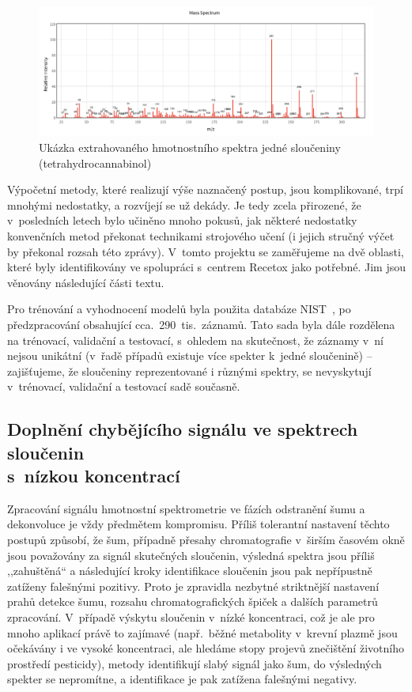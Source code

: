 \documentclass[a4paper,11pt]{article}
\begin{document}
\begin{figure}
\begin{center}
\includegraphics[width=.8\hsize]{thc}
\end{center}
\caption{Ukázka extrahovaného hmotnostního spektra jedné sloučeniny (tetrahydrocannabinol)}
\label{f:thc}
\end{figure}

Výpočetní metody, které realizují výše naznačený postup, jsou komplikované, trpí mnohými nedostatky,
a rozvíjejí se už dekády.
Je tedy zcela přirozené, že v~posledních letech bylo učiněno mnoho pokusů, jak některé nedostatky 
konvenčních metod překonat technikami strojového učení (i jejich stručný výčet by překonal rozsah této zprávy).
V~tomto projektu se zaměřujeme na dvě oblasti, které byly identifikovány ve spolupráci s~centrem Recetox jako potřebné.
Jim jsou věnovány následující části textu.

Pro trénování a vyhodnocení modelů byla použita databáze NIST~\cite{nist}, po předzpracování obsahující
cca.~290~tis.\ záznamů. 
Tato sada byla dále rozdělena na trénovací, validační a testovací,
s~ohledem na skutečnost, že záznamy v~ní nejsou unikátní (v~řadě případů existuje více spekter k~jedné sloučenině) --
zajišťujeme, že sloučeniny reprezentované i různými spektry, se nevyskytují v~trénovací, validační a testovací sadě
současně. 

\subsection{Doplnění chybějícího signálu ve spektrech sloučenin\\ s~nízkou koncentrací}

Zpracování signálu hmotnostní spektrometrie ve fázích odstranění šumu a dekonvoluce je vždy předmětem kompromisu.
Příliš tolerantní nastavení těchto postupů způsobí, že šum, případně přesahy chromatografie v~širším časovém okně jsou
považovány za signál skutečných sloučenin, výsledná spektra jsou příliš ,,zahuštěná`` a následující kroky identifikace
sloučenin jsou pak nepřípustně zatíženy falešnými pozitivy.
Proto je zpravidla nezbytné striktnější nastavení prahů detekce šumu, rozsahu chromatografických špiček a dalších parametrů
zpracování.
V~případě výskytu sloučenin v~nízké koncentraci, což je ale pro mnoho aplikací právě to zajímavé (např.\ běžné metabolity
v~krevní plazmě jsou očekávány i ve vysoké koncentraci, ale hledáme stopy projevů znečištění životního prostředí
pesticidy), metody identifikují slabý signál jako šum, do výsledných spekter se nepromítne, a identifikace je pak zatížena
falešnými negativy.
\end{document}
